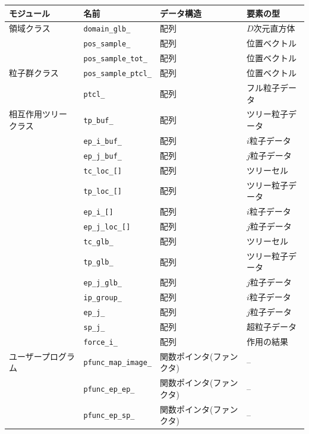 \documentclass[12pt,a4paper]{jarticle}
\begin{document}
\begin{table}
  \begin{center}
    \begin{tabular}{llll}
      \hline
      モジュール & 名前 & データ構造 & 要素の型 \\      
      \hline
      \hline
      領域クラス & {\tt domain\_glb\_}      & 配列 & $D$次元直方体 \\
                 & {\tt pos\_sample\_}      & 配列 & 位置ベクトル \\
                 & {\tt pos\_sample\_tot\_} & 配列 & 位置ベクトル \\
      \hline
      粒子群クラス & {\tt pos\_sample\_ptcl\_} & 配列 & 位置ベクトル   \\
                   & {\tt ptcl\_}              & 配列 & フル粒子データ \\
      \hline
      相互作用ツリークラス & {\tt tp\_buf\_}             & 配列 & ツリー粒子データ \\
                           & {\tt ep\_i\_buf\_}          & 配列 & $i$粒子データ \\
                           & {\tt ep\_j\_buf\_}          & 配列 & $j$粒子データ \\
                           & {\tt tc\_loc\_[]}           & 配列 & ツリーセル \\
                           & {\tt tp\_loc\_[]}           & 配列 & ツリー粒子データ \\
                           & {\tt ep\_i\_[]}             & 配列 & $i$粒子データ \\
                           & {\tt ep\_j\_loc\_[]}        & 配列 & $j$粒子データ \\
                           & {\tt tc\_glb\_}             & 配列 & ツリーセル \\
                           & {\tt tp\_glb\_}             & 配列 & ツリー粒子データ \\
                           & {\tt ep\_j\_glb\_}          & 配列 & $j$粒子データ \\
                           & {\tt ip\_group\_}           & 配列 & $i$粒子データ \\
                           & {\tt ep\_j\_}               & 配列 & $j$粒子データ \\
                           & {\tt sp\_j\_}               & 配列 & 超粒子データ \\
                           & {\tt force\_i\_}            & 配列 & 作用の結果 \\
      \hline
      ユーザープログラム & {\tt pfunc\_map\_image\_} & 関数ポインタ(ファンクタ) & -- \\
                         & {\tt pfunc\_ep\_ep\_}     & 関数ポインタ(ファンクタ) & -- \\
                         & {\tt pfunc\_ep\_sp\_}     & 関数ポインタ(ファンクタ) & -- \\
      \hline
    \end{tabular}
  \end{center}
\end{table}
\end{document}
